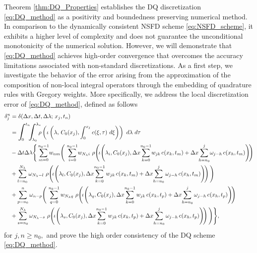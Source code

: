 \documentclass[a4paper, UKenglish, numberwithinsect, thm-restate]{tgdk-v2021}
\begin{document}
Theorem \ref{thm:DQ_Properties} establishes the DQ discretization \eqref{eq:DQ_method} as a positivity and boundedness preserving numerical method. In comparison to the dynamically consistent NSFD scheme \eqref{eq:NSFD_scheme}, it exhibits a higher level of complexity and does not guarantee the unconditional monotonicity of the numerical solution. However, we will demonstrate that \eqref{eq:DQ_method} achieves high-order convergence that overcomes the accuracy limitations associated with non-standard discretizations. As a first step, we investigate the behavior of the error arising from the approximation of the composition of non-local integral operators through the embedding of quadrature rules with Gregory weights. More specifically, we address the local discretization error of \eqref{eq:DQ_method}, defined as follows
\begin{equation}\label{eq:DQ_local_error}
    \allowdisplaybreaks
    \begin{split}
        \delta_j^n&=\delta(\Delta x, \Delta t, \Delta \lambda; \,  x_j,t_n) \\ 
        &=\displaystyle \scalebox{1.3}{$\displaystyle\int$}_{\!\!\!\!\! 0}^{t_n} \!\! \scalebox{1.3}{$\displaystyle\int$}_{\!\!\!\!\! \lambda_{0}}^{\lambda_{*}} \!\!\! \rho\left(\iota\left(\lambda,\, C_0(x_j), \int_0^{x_j}    c(\xi,\tau)  \ d\xi\right)\right) \ d\lambda \ d \tau \\
        &-\Delta t \Delta \lambda  \Bigg\{ \sum_{m=0}^{n_0-1} \! w_{n m} \Bigg( \, \sum_{i=0}^{n_0-1} \! w_{N_\lambda i} \ \rho \! \left( \! \iota \! \left(\lambda_i, C_0(x_j) , \Delta x \! \sum_{k=0}^{n_0-1} \! w_{jk} \, c(x_k,t_m)+\Delta x \! \sum_{h=n_0}^{j} \! \omega_{j-h} \, c(x_h,t_m) \right)\!\right) \\
        &+ \sum_{l=n_0}^{N_\lambda} \omega_{N_\lambda-l} \ \rho \! \left( \! \iota \! \left(\lambda_l, C_0(x_j) , \Delta x \! \sum_{k=0}^{n_0-1}w_{jk} \, c(x_k,t_m)+\Delta x \! \sum_{h=n_0}^{j}\omega_{j-h} \, c(x_h,t_m) \right)\!\right)\Bigg) \\
        &+ \sum_{p=n_0}^{n} \omega_{n-p} \Bigg( \, \sum_{q=0}^{n_0-1} w_{N_\lambda q} \ \rho \! \left( \! \iota \! \left(\lambda_q, C_0(x_j) , \Delta x \! \sum_{k=0}^{n_0-1}w_{jk} \, c(x_k,t_p)+\Delta x \! \sum_{h=n_0}^{j}\omega_{j-h} \, c(x_h,t_p) \right)\!\right) \\
        &+ \sum_{s=n_0}^{N_\lambda} \omega_{N_\lambda-s} \ \rho \! \left( \! \iota \! \left(\lambda_s, C_0(x_j) , \Delta x \! \sum_{k=0}^{n_0-1}w_{jk} \, c(x_k,t_p)+\Delta x \! \sum_{h=n_0}^{j}\omega_{j-h} \, c(x_h,t_p) \right)\!\right)\Bigg) \Bigg\}, 
    \end{split}
\end{equation}
for $j,n\geq n_0,$ and prove the high order consistency of the DQ scheme \eqref{eq:DQ_method}.
\end{document}
